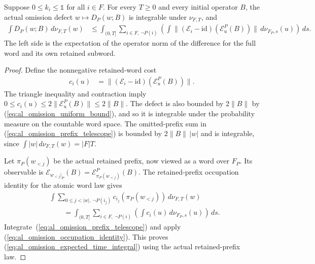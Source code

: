 \begin{theorem}
    \label{thm:al_channel_word_expected_omission}
    \leanok
    Suppose $0\le k_i\le\mathbb 1$ for all $i\in F$.
    For every $T\ge0$ and every initial operator $B$, the actual
    omission defect $w\mapsto D_P(w;B)$ is integrable under
    $\nu_{F,T}$, and
    \begin{align}
        \label{eq:al_omission_expected_time_integral}
        \int D_P(w;B)\,d\nu_{F,T}(w)
         & \le\int_{(0,T]}\sum_{i\in F,\ \neg P(i)}
        \left(\int
        \|(\mathcal E_i-\mathrm{id})(\mathcal E_u^P(B))\|
        \,d\nu_{F_P,s}(u)\right)\,ds.
    \end{align}
    The left side is the expectation of the operator norm of the
    difference for the full word and its own retained subword.
\end{theorem}
\begin{proof}
    \leanok
    Define the nonnegative retained-word cost
    \begin{align}
        \label{eq:al_omission_retained_cost}
        c_i(u) & =\|(\mathcal E_i-\mathrm{id})(\mathcal E_u^P(B))\|.
    \end{align}
    The triangle inequality and contraction imply
    $0\le c_i(u)\le2\|\mathcal E_u^P(B)\|\le2\|B\|$.
    The defect is also bounded by $2\|B\|$ by
    (\ref{eq:al_omission_uniform_bound}), and so it is integrable
    under the probability measure on the countable word space.
    The omitted-prefix sum in
    (\ref{eq:al_omission_prefix_telescope}) is bounded by
    $2\|B\|\,|w|$ and is integrable, since
    $\int|w|\,d\nu_{F,T}(w)=|F|T$.

    Let $\pi_P(w_{<j})$ be the actual retained prefix, now viewed
    as a word over $F_P$. Its observable is
    $\mathcal E_{w_{<j}|_P}(B)=\mathcal E^P_{\pi_P(w_{<j})}(B)$.
    The retained-prefix occupation identity for the atomic
    word law gives
    \begin{align}
        \label{eq:al_omission_occupation_identity}
         & \int\sum_{0\le j<|w|,\ \neg P(i_j)}
        c_{i_j}(\pi_P(w_{<j}))\,d\nu_{F,T}(w)\nonumber  \\
         & \qquad=\int_{(0,T]}\sum_{i\in F,\ \neg P(i)}
        \left(\int c_i(u)\,d\nu_{F_P,s}(u)\right)\,ds.
    \end{align}
    Integrate~(\ref{eq:al_omission_prefix_telescope}) and apply
    (\ref{eq:al_omission_occupation_identity}). This proves
    (\ref{eq:al_omission_expected_time_integral}) using the actual
    retained-prefix law.
\end{proof}

